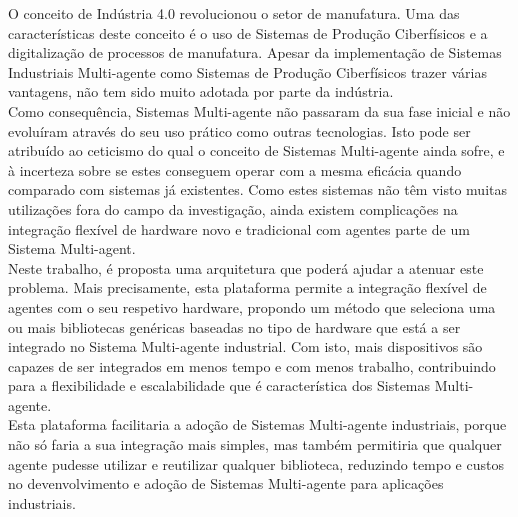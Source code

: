 
%

O conceito de Indústria 4.0 revolucionou o setor de manufatura. Uma das características deste conceito é o uso de Sistemas de Produção Ciberfísicos e a digitalização de processos de manufatura. Apesar da implementação de Sistemas Industriais Multi-agente como Sistemas de Produção Ciberfísicos trazer várias vantagens, não tem sido muito adotada por parte da indústria.\\

Como consequência, Sistemas Multi-agente não passaram da sua fase inicial e não evoluíram através do seu uso prático como outras tecnologias. Isto pode ser atribuído ao ceticismo do qual o conceito de Sistemas Multi-agente ainda sofre, e à incerteza sobre se estes conseguem operar com a mesma eficácia quando comparado com sistemas já existentes. Como estes sistemas não têm visto muitas utilizações fora do campo da investigação, ainda existem complicações na integração flexível de hardware novo e tradicional com agentes parte de um Sistema Multi-agent.\\

Neste trabalho, é proposta uma arquitetura que poderá ajudar a atenuar este problema. Mais precisamente, esta plataforma permite a integração flexível de agentes com o seu respetivo hardware, propondo um método que seleciona uma ou mais bibliotecas genéricas baseadas no tipo de hardware que está a ser integrado no Sistema Multi-agente industrial. Com isto, mais dispositivos são capazes de ser integrados em menos tempo e com menos trabalho, contribuindo para a flexibilidade e escalabilidade que é característica dos Sistemas Multi-agente.\\

Esta plataforma facilitaria a adoção de Sistemas Multi-agente industriais, porque não só faria a sua integração mais simples, mas também permitiria que qualquer agente pudesse utilizar e reutilizar qualquer biblioteca, reduzindo tempo e custos no devenvolvimento e adoção de Sistemas Multi-agente para aplicações industriais.

%
%

